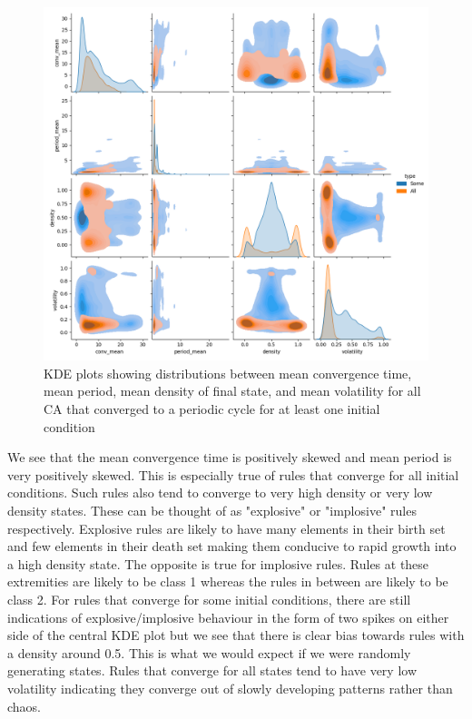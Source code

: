 \begin{figure}[!h]
\centering 
\includegraphics[width=\textwidth]{images/tax-pairplot.png}
\caption{KDE plots showing distributions between mean convergence time, mean period, mean density of final state, and mean volatility for all CA that converged to a periodic cycle for at least one initial condition}
\label{fig:tax-pairplot}
\end{figure}

We see that the mean convergence time is positively skewed and mean period is very positively skewed. This is especially true of rules that converge for all initial conditions. Such rules also tend to converge to very high density or very low density states. These can be thought of as "explosive" or "implosive" rules respectively. Explosive rules are likely to have many elements in their birth set and few elements in their death set making them conducive to rapid growth into a high density state. The opposite is true for implosive rules. Rules at these extremities are likely to be class 1 whereas the rules in between are likely to be class 2. For rules that converge for some initial conditions, there are still indications of explosive/implosive behaviour in the form of two spikes on either side of the central KDE plot but we see that there is clear bias towards rules with a density around 0.5. This is what we would expect if we were randomly generating states. Rules that converge for all states tend to have very low volatility indicating they converge out of slowly developing patterns rather than chaos.\\

